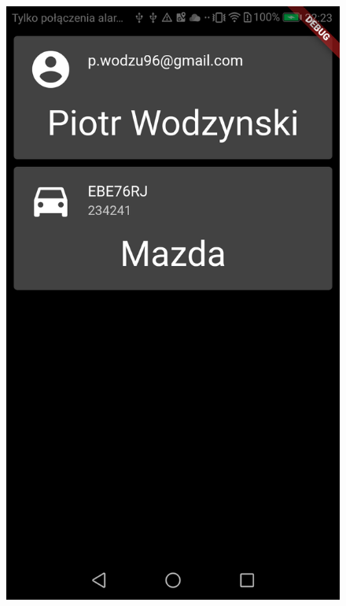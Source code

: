 \documentclass[12pt]{article}
\begin{document}
	\begin{figure}[H]
		\centering
		\includegraphics[scale=0.21]{app_mobilna1.png}

\end{figure}
\end{document}
